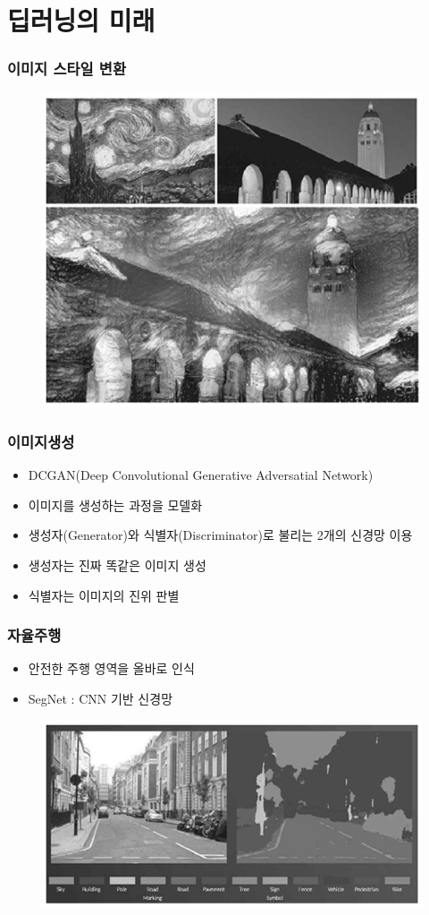 \documentclass{beamer}
\begin{document}
\section{딥러닝의 미래}
\begin{frame}
	\frametitle{이미지 스타일 변환}
		\begin{figure}
			\includegraphics[width=0.6\columnwidth]{Fig_deep/Figure_14.pdf}
		\end{figure}
\end{frame}

\begin{frame}
	\frametitle{이미지생성}
		\begin{itemize}
			\item DCGAN(Deep Convolutional Generative Adversatial Network)
			\item 이미지를 생성하는 과정을 모델화
			\item 생성자(Generator)와 식별자(Discriminator)로 불리는 2개의 신경망 이용
			\item 생성자는 진짜 똑같은 이미지 생성
			\item 식별자는 이미지의 진위 판별
		\end{itemize}
\end{frame}

\begin{frame}
	\frametitle{자율주행}
		\begin{itemize}
			\item 안전한 주행 영역을 올바로 인식
			\item SegNet : CNN 기반 신경망
		\end{itemize}
		\begin{figure}
			\includegraphics[width=0.8\columnwidth]{Fig_deep/Figure_15.pdf}
		\end{figure}
\end{frame}
\end{document}
